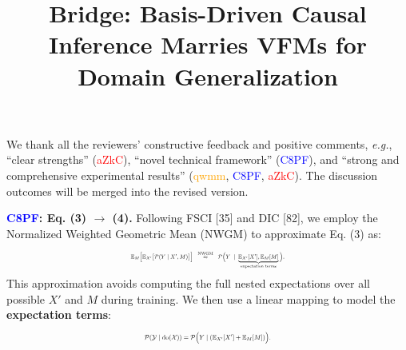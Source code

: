 \documentclass[10pt,twocolumn,letterpaper]{article}
\begin{document}
\title{Bridge: Basis-Driven Causal Inference Marries VFMs for Domain Generalization}  %

\maketitle
\thispagestyle{empty}
\appendix

We thank all the reviewers' constructive feedback and positive comments, 
\textit{e.g.}, ``clear strengths'' (\textcolor{red}{aZkC}), 
``novel technical framework'' (\textcolor{blue}{C8PF}), 
and ``strong and comprehensive experimental results'' (\textcolor{orange}{qwmm}, \textcolor{blue}{C8PF}, \textcolor{red}{aZkC}). 
The discussion outcomes will be merged into the revised version.


\noindent\textbf{\textcolor{blue}{C8PF}: Eq. (3) $\to$ (4).}
Following FSCI [35] and DIC [82], we employ the Normalized Weighted Geometric Mean (NWGM) to approximate Eq. (3) as:
\vspace{-4pt}
\begin{equation*}
\resizebox{0.4\textwidth}{!}{%
$\displaystyle
\mathbb{E}_M \Big[ \mathbb{E}_{X'} \big[ \mathcal{P}(Y \mid X', M) \big] \Big]
\;\;\overset{\text{NWGM}}{\approx}\;\;
\mathcal{P}\Big(
Y \;\mid\; 
\underbrace{\mathbb{E}_{X'}[X'], \mathbb{E}_M[M]}_{\text{expectation terms}}
\Big)
$.}
\vspace{-1mm}
\end{equation*}
This approximation avoids computing the full nested expectations over all possible $X'$ and $M$ during  
training.
We then use a linear mapping to model the \textbf{expectation terms}:
\vspace{-4pt}
\begin{equation*} 
\resizebox{0.33\textwidth}{!}{%
$\displaystyle
\mathcal{P}(\mathcal{Y} \mid \mathrm{do}(\mathcal{X})) =
\mathcal{P}\Big(
Y \mid (\mathbb{E}_{X'}[X'] + \mathbb{E}_M[M])
\Big)
$.}
\vspace{-2mm}
\end{equation*}
\end{document}
